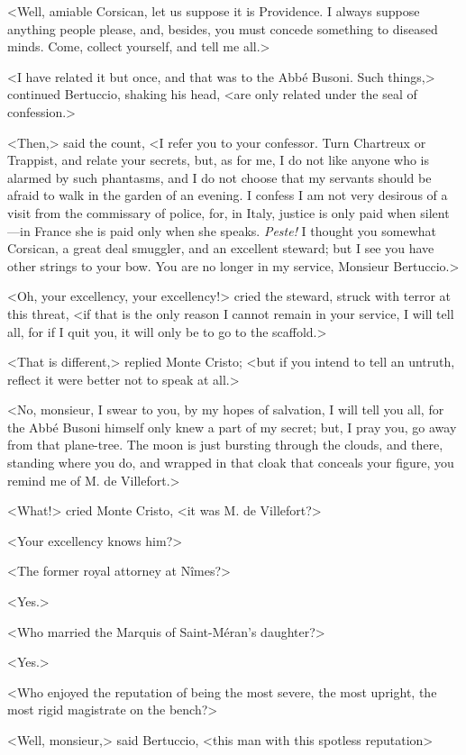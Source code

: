  <Well, amiable Corsican, let us suppose it is Providence. I always suppose anything people please, and, besides, you must concede something to diseased minds. Come, collect yourself, and tell me all.> 

 <I have related it but once, and that was to the Abbé Busoni. Such things,> continued Bertuccio, shaking his head, <are only related under the seal of confession.> 

 <Then,> said the count, <I refer you to your confessor. Turn Chartreux or Trappist, and relate your secrets, but, as for me, I do not like anyone who is alarmed by such phantasms, and I do not choose that my servants should be afraid to walk in the garden of an evening. I confess I am not very desirous of a visit from the commissary of police, for, in Italy, justice is only paid when silent—in France she is paid only when she speaks. \textit{Peste!} I thought you somewhat Corsican, a great deal smuggler, and an excellent steward; but I see you have other strings to your bow. You are no longer in my service, Monsieur Bertuccio.> 

 <Oh, your excellency, your excellency!> cried the steward, struck with terror at this threat, <if that is the only reason I cannot remain in your service, I will tell all, for if I quit you, it will only be to go to the scaffold.> 

 <That is different,> replied Monte Cristo; <but if you intend to tell an untruth, reflect it were better not to speak at all.> 

 <No, monsieur, I swear to you, by my hopes of salvation, I will tell you all, for the Abbé Busoni himself only knew a part of my secret; but, I pray you, go away from that plane-tree. The moon is just bursting through the clouds, and there, standing where you do, and wrapped in that cloak that conceals your figure, you remind me of M. de Villefort.> 

 <What!> cried Monte Cristo, <it was M. de Villefort?> 

 <Your excellency knows him?> 

 <The former royal attorney at Nîmes?> 

 <Yes.> 

 <Who married the Marquis of Saint-Méran's daughter?> 

 <Yes.> 

 <Who enjoyed the reputation of being the most severe, the most upright, the most rigid magistrate on the bench?> 

 <Well, monsieur,> said Bertuccio, <this man with this spotless reputation\longdash> 

